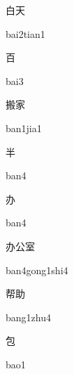 \begin{verbete}{白天}
\begin{pronuncia}{bai2tian1}
\end{pronuncia}
\end{verbete}

\begin{verbete}[bai3]{百}
\begin{pronuncia}{bai3}
\end{pronuncia}
\end{verbete}

\begin{verbete}{搬家}
\begin{pronuncia}{ban1jia1}
\end{pronuncia}
\end{verbete}

\begin{verbete}[ban4]{半}
\begin{pronuncia}{ban4}
\end{pronuncia}
\end{verbete}

\begin{verbete}[ban4]{办}
\begin{pronuncia}{ban4}
\end{pronuncia}
\end{verbete}

\begin{verbete}{办公室}
\begin{pronuncia}{ban4gong1shi4}
\end{pronuncia}
\end{verbete}

\begin{verbete}{帮助}
\begin{pronuncia}{bang1zhu4}
\end{pronuncia}
\end{verbete}

\begin{verbete}[bao1]{包}
\begin{pronuncia}{bao1}
\end{pronuncia}
\end{verbete}


